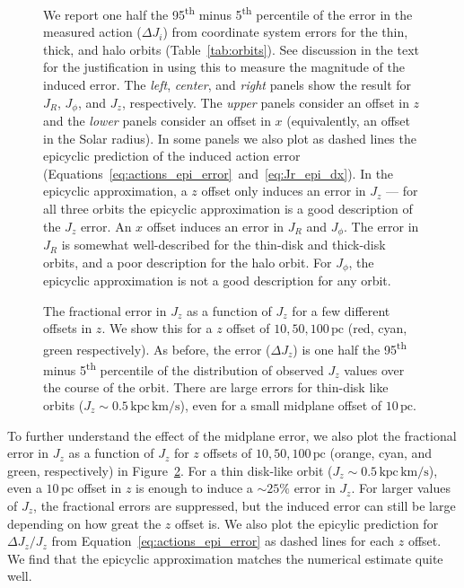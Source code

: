 \documentclass[twocolumn]{aastex62}
\newcommand{\pc}{\text{pc}}
\newcommand{\kms}{\text{km}/\text{s}}
\newcommand{\actunit}{\text{kpc}\,\kms}
\newcommand{\uth}{\textsuperscript{th}}
\begin{document}
\begin{figure}
\caption{We report one half the 95\uth{} minus 5\uth{} percentile of the error
in the measured action ($\Delta J_i$) from coordinate system errors for the
thin, thick, and halo orbits (Table~\ref{tab:orbits}). See discussion in the
text for the justification in using this to measure the magnitude of the
induced error. The {\em left}, {\em center}, and {\em right} panels show the
result for $J_R$, $J_{\phi}$, and $J_z$, respectively. The {\em upper} panels
consider an offset in $z$ and the {\em lower} panels consider an offset in $x$
(equivalently, an offset in the Solar radius). In some panels we also plot as
dashed lines the epicyclic prediction of the induced action error
(Equations~\ref{eq:actions_epi_error}~and~\ref{eq:Jr_epi_dx}). In the
epicyclic approximation, a $z$ offset only induces an error in $J_z$ --- for
all three orbits the epicyclic approximation is a good description of the
$J_z$ error. An $x$ offset induces an error in $J_R$ and $J_{\phi}$. The error in
$J_R$ is somewhat well-described for the thin-disk and thick-disk orbits, and
a poor description for the halo orbit. For $J_{\phi}$, the epicyclic approximation
is not a good description for any orbit.}
\label{fig:many_orbit_wrong_ref}
\end{figure}

\begin{figure}
\caption{The fractional error in $J_z$ as a function of $J_z$ for a few
different offsets in $z$. We show this for a $z$ offset of $10, 50, 100\,\pc$
(red, cyan, green respectively). As before, the error ($\Delta J_z$) is one
half the 95\uth{} minus 5\uth{} percentile of the distribution of observed
$J_z$ values over the course of the orbit. There are large errors for
thin-disk like orbits ($J_z \sim 0.5\,\actunit$), even for a small midplane
offset of $10\,\pc$. }
\label{fig:dJz_fun_Jz}
\end{figure}

To further understand the effect of the midplane error, we also plot the
fractional error in $J_z$ as a function of $J_z$ for $z$ offsets of $10, 50,
100\,\pc$ (orange, cyan, and green, respectively) in
Figure~\ref{fig:dJz_fun_Jz}. For a thin disk-like orbit
($J_z\sim0.5\,\actunit$), even a $10\,\pc$ offset in $z$ is enough to induce a
$\sim25\%$ error in $J_z$. For larger values of $J_z$, the fractional errors
are suppressed, but the induced error can still be large depending on how
great the $z$ offset is. We also plot the epicylic prediction for $\Delta J_z
/ J_z$ from Equation~\ref{eq:actions_epi_error} as dashed lines for each $z$
offset. We find that the epicyclic approximation matches the numerical
estimate quite well.
\end{document}
